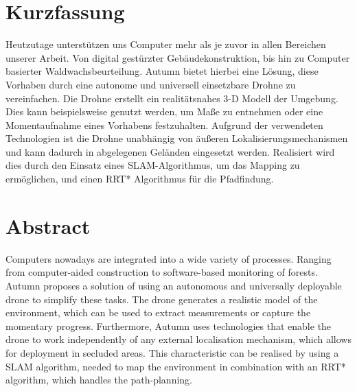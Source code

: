 \chapter{Kurzfassung}

\vspace{10mm}

Heutzutage unterstützen uns Computer mehr als je zuvor in allen Bereichen unserer Arbeit. Von digital gestürzter Gebäudekonstruktion, bis hin zu Computer basierter Waldwachsbeurteilung. Autumn bietet hierbei eine Lösung, diese Vorhaben durch eine autonome und universell einsetzbare Drohne zu vereinfachen. Die Drohne erstellt ein realitätsnahes 3-D Modell der Umgebung. Dies kann beispielsweise genutzt werden, um Maße zu entnehmen oder eine Momentaufnahme eines Vorhabens festzuhalten. Aufgrund der verwendeten Technologien ist die Drohne unabhängig von äußeren Lokalisierungsmechanismen und kann dadurch in abgelegenen Geländen eingesetzt werden. Realisiert wird dies durch den Einsatz eines SLAM-Algorithmus, um das Mapping zu ermöglichen, und einen RRT* Algorithmus für die Pfadfindung.

\chapter{Abstract}

\vspace{10mm}

Computers nowadays are integrated into a wide variety of processes. Ranging from computer-aided construction to software-based monitoring of forests. Autumn proposes a solution of using an autonomous and universally deployable drone to simplify these tasks. The drone generates a realistic model of the environment, which can be used to extract measurements or capture the momentary progress. Furthermore, Autumn uses technologies that enable the drone to work independently of any external localisation mechanism, which allows for deployment in secluded areas. This characteristic can be realised by using a SLAM algorithm, needed to map the environment in combination with an RRT* algorithm, which handles the path-planning.
